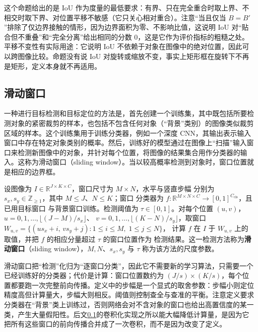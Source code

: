 \documentclass[../../main.tex]{subfiles}
\begin{document}
\begin{remark}
这个命题给出的是 IoU 作为度量的最低要求：有界、只在完全重合时取上界、不相交时取下界、对位置平移不敏感（它只关心相对重合）。注意“当且仅当 $B=B'$”排除了仅边界接触的情形，因为边界面积为零、不影响比值，这说明 IoU 对“贴合但不重叠”和“完全分离”给出相同的分数 $0$，这是它作为评价指标的粗糙之处。平移不变性有实际用途：它说明 IoU 不依赖于对象在图像中的绝对位置，因此可以跨图像比较。命题没有说 IoU 对旋转或缩放不变，事实上矩形框在旋转下不再是矩形，定义本身就不再适用。
\end{remark}

\subsection{滑动窗口}\label{subsection:ch10-滑动窗口}

一种进行目标检测和目标定位的方法是，首先创建一个训练集，其中既包括所要检测对象的紧密裁剪的样本，也包括不包含任何对象（“背景”类别）的图像类似裁剪区域的样本。这个训练集用于训练分类器，例如一个深度 CNN，其输出表示输入窗口中存在特定对象类别的概率。然后，训练好的模型通过在图像上“扫描”输入窗口来检测新图像中的对象，并针对每个位置，将图像的结果集合用作分类器的输入。这称为滑动窗口（sliding window）。当以较高概率检测到对象时，窗口位置就是相应的边界框。

\begin{definition}[滑动窗口]\label{definition:ch10-滑动窗口}
设图像为 $I\in\mathbb{R}^{J\times K\times C}$，窗口尺寸为 $M\times N$，水平与竖直步幅
分别为 $s_x,s_y\in\mathbb{Z}_{\geqslant1}$，其中 $M\leqslant J$、$N\leqslant K$；窗口
分类器为 $f:\mathbb{R}^{M\times N\times C}\to[0,1]^{C_{\mathrm{cls}}}$，且已用目标窗口
与背景窗口训练。检测阈值为 $\tau\in[0,1]$。对每个位置
$(u,v)$，$u=0,1,\dots,\lfloor(J-M)/s_x\rfloor$、
$v=0,1,\dots,\lfloor(K-N)/s_y\rfloor$，取窗口
$W_{u,v}=\{(u s_x+i,\,v s_y+j):1\leqslant i\leqslant M,\;1\leqslant j\leqslant N\}$，
计算 $f$ 在 $I$ 于 $W_{u,v}$ 上的取值，并把 $f$ 的相应分量超过 $\tau$ 的窗口位置作为
检测结果。这一检测方法称为\textbf{滑动窗口}（sliding window），$M,N$、$s_x,s_y$ 与
$\tau$ 称为该方法的尺度参数。
\end{definition}

\begin{remark}
滑动窗口把“检测”化归为“逐窗口分类”，因此它不需要新的学习算法，只需要一个已经训练好的分类器；代价是计算：窗口位置数约为 $(J/s)\times(K/s)$，每个位置都要跑一次完整前向传播。定义中的步幅是一个显式的取舍参数：步幅小则定位精度高但计算量大，步幅大则相反。阈值则控制查全与查准的平衡。注意定义要求分类器在“背景”类上训练过，否则网络会对不含对象的窗口也给出高置信度的某一类，产生大量假阳性。后文\cref{subsection:ch10-滑动窗口}的卷积化实现之所以能大幅降低计算量，是因为它把所有这些窗口的前向传播合并成了一次卷积，而不是因为改变了定义。
\end{remark}
\end{document}
